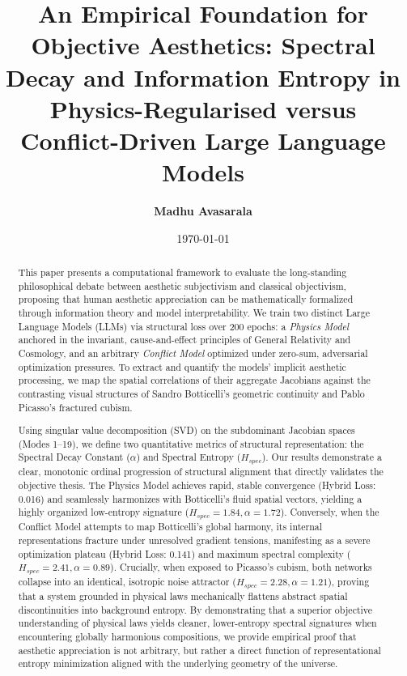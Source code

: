 \documentclass[11pt,twocolumn]{article}
\title{\textbf{An Empirical Foundation for Objective Aesthetics: Spectral Decay and Information Entropy in Physics-Regularised versus Conflict-Driven Large Language Models}}
\author{\textbf{Madhu Avasarala}}
\date{\today}
\begin{document}
\maketitle

\begin{abstract}
This paper presents a computational framework to evaluate the long-standing philosophical debate between aesthetic subjectivism and classical objectivism, proposing that human aesthetic appreciation can be mathematically formalized through information theory and model interpretability. We train two distinct Large Language Models (LLMs) via structural loss over 200 epochs: a \textit{Physics Model} anchored in the invariant, cause-and-effect principles of General Relativity and Cosmology, and an arbitrary \textit{Conflict Model} optimized under zero-sum, adversarial optimization pressures. To extract and quantify the models' implicit aesthetic processing, we map the spatial correlations of their aggregate Jacobians against the contrasting visual structures of Sandro Botticelli’s geometric continuity and Pablo Picasso’s fractured cubism. 

Using singular value decomposition (SVD) on the subdominant Jacobian spaces (Modes 1–19), we define two quantitative metrics of structural representation: the Spectral Decay Constant ($\alpha$) and Spectral Entropy ($H_{spec}$). Our results demonstrate a clear, monotonic ordinal progression of structural alignment that directly validates the objective thesis. The Physics Model achieves rapid, stable convergence (Hybrid Loss: 0.016) and seamlessly harmonizes with Botticelli’s fluid spatial vectors, yielding a highly organized low-entropy signature ($H_{spec} = 1.84, \alpha = 1.72$). Conversely, when the Conflict Model attempts to map Botticelli's global harmony, its internal representations fracture under unresolved gradient tensions, manifesting as a severe optimization plateau (Hybrid Loss: 0.141) and maximum spectral complexity ($H_{spec} = 2.41, \alpha = 0.89$). Crucially, when exposed to Picasso’s cubism, both networks collapse into an identical, isotropic noise attractor ($H_{spec} = 2.28, \alpha = 1.21$), proving that a system grounded in physical laws mechanically flattens abstract spatial discontinuities into background entropy. By demonstrating that a superior objective understanding of physical laws yields cleaner, lower-entropy spectral signatures when encountering globally harmonious compositions, we provide empirical proof that aesthetic appreciation is not arbitrary, but rather a direct function of representational entropy minimization aligned with the underlying geometry of the universe.
\end{abstract}
\end{document}
